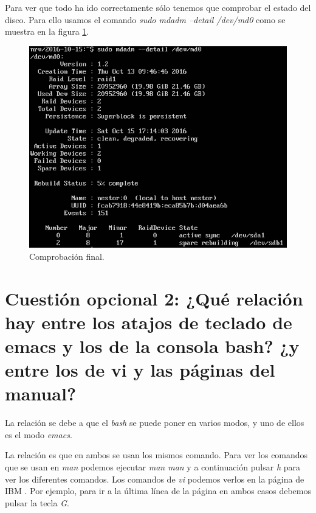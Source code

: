 \documentclass[a4paper,titlepage,12pt]{report}	%
\numberwithin{figure}{section} %
\numberwithin{table}{section} %
\begin{document}
	Para ver que todo ha ido correctamente sólo tenemos que comprobar el estado del disco. Para ello usamos el comando \textit{sudo mdadm --detail /dev/md0} como se muestra en la figura \ref{P1-comprobacionRAID5}.

	\begin{figure}[H]
		\centering
		\includegraphics[scale=0.73]{./Imagenes/P1/ComprobarRAID5.png}
		\caption[Comprobación final.]{Comprobación final.}
		\label{P1-comprobacionRAID5}
	\end{figure}

	\section[Cuestión opcional 2: ¿Qué relación hay entre los atajos de teclado de emacs y los de la consola bash? ¿y entre los de vi y las páginas del manual?]{Cuestión opcional 2: ¿Qué relación hay entre los atajos de teclado de emacs y los de la consola bash? ¿y entre los de vi y las páginas del manual?}

	La relación se debe a que el \textit{bash} se puede poner en varios modos, y uno de ellos es el modo \textit{emacs}. \cite{bashemacs}

	La relación es que en ambos se usan los mismos comando. Para ver los comandos que se usan en \textit{man} podemos ejecutar \textit{man man} y a continuación pulsar \textit{h} para ver los diferentes comandos. Los comandos de \textit{vi} podemos verlos en la página de IBM \cite{vi}. Por ejemplo, para ir a la última línea de la página en ambos casos debemos pulsar la tecla \textit{G}.
\end{document}
